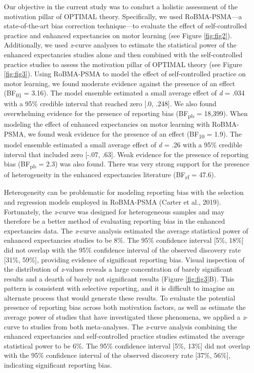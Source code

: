 \documentclass[
  man, donotrepeattitle,floatsintext]{apa7}
\begin{document}
Our objective in the current study was to conduct a holistic assessment of the motivation pillar of OPTIMAL theory. Specifically, we used RoBMA-PSMA---a state-of-the-art bias correction technique---to evaluate the effect of self-controlled practice and enhanced expectancies on motor learning (see Figure \ref{fig:fig2}). Additionally, we used \emph{z}-curve analyses to estimate the statistical power of the enhanced expectancies studies alone and then combined with the self-controlled practice studies to assess the motivation pillar of OPTIMAL theory (see Figure \ref{fig:fig3}). Using RoBMA-PSMA to model the effect of self-controlled practice on motor learning, we found moderate evidence against the presence of an effect (BF\textsubscript{01} = 3.16). The model ensemble estimated a small average effect of \emph{d} = .034 with a 95\% credible interval that reached zero {[}.0, .248{]}. We also found overwhelming evidence for the presence of reporting bias (BF\textsubscript{pb} = 18,399). When modeling the effect of enhanced expectancies on motor learning with RoBMA-PSMA, we found weak evidence for the presence of an effect (BF\textsubscript{10} = 1.9). The model ensemble estimated a small average effect of \emph{d} = .26 with a 95\% credible interval that included zero {[}-.07, .63{]}. Weak evidence for the presence of reporting bias (BF\textsubscript{pb} = 2.3) was also found. There was very strong support for the presence of heterogeneity in the enhanced expectancies literature (BF\textsubscript{rf} = 47.6).

Heterogeneity can be problematic for modeling reporting bias with the selection and regression models employed in RoBMA-PSMA (Carter et al., 2019). Fortunately, the \emph{z}-curve was designed for heterogeneous samples and may therefore be a better method of evaluating reporting bias in the enhanced expectancies data. The \emph{z}-curve analysis estimated the average statistical power of enhanced expectancies studies to be 8\%. The 95\% confidence interval {[}5\%, 18\%{]} did not overlap with the 95\% confidence interval of the observed discovery rate {[}31\%, 59\%{]}, providing evidence of significant reporting bias. Visual inspection of the distribution of \emph{z}-values reveals a large concentration of barely significant results and a dearth of barely not significant results (Figure \ref{fig:fig3}B). This pattern is consistent with selective reporting, and it is difficult to imagine an alternate process that would generate these results. To evaluate the potential presence of reporting bias across both motivation factors, as well as estimate the average power of studies that have investigated these phenomena, we applied a \emph{z}-curve to studies from both meta-analyses. The \emph{z}-curve analysis combining the enhanced expectancies and self-controlled practice studies estimated the average statistical power to be 6\%. The 95\% confidence interval {[}5\%, 13\%{]} did not overlap with the 95\% confidence interval of the observed discovery rate {[}37\%, 56\%{]}, indicating significant reporting bias.
\end{document}
